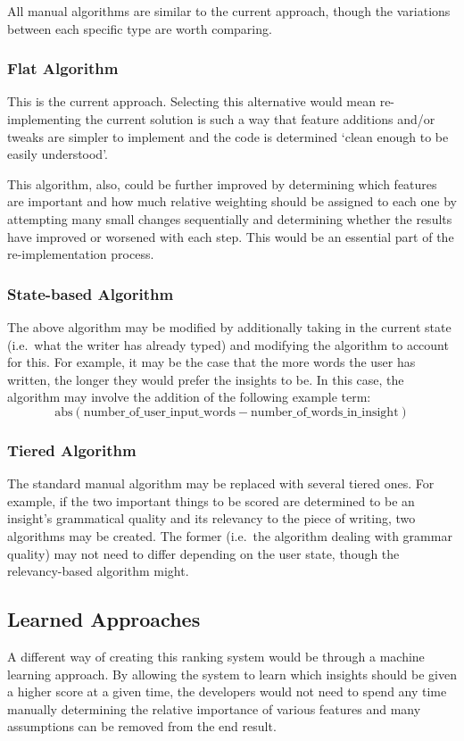 \documentclass[12pt]{article}
\begin{document}
All manual algorithms are similar to the current approach, though the variations between each specific type are worth comparing.

\subsubsection{Flat Algorithm}
This is the current approach. Selecting this alternative would mean re-implementing the current solution is such a way that feature additions and/or tweaks are simpler to implement and the code is determined `clean enough to be easily understood'.

This algorithm, also, could be further improved by determining which features are important and how much relative weighting should be assigned to each one by attempting many small changes sequentially and determining whether the results have improved or worsened with each step. This would be an essential part of the re-implementation process.

\subsubsection{State-based Algorithm}
The above algorithm may be modified by additionally taking in the current state (i.e.\ what the writer has already typed) and modifying the algorithm to account for this. For example, it may be the case that the more words the user has written, the longer they would prefer the insights to be. In this case, the algorithm may involve the addition of the following example term: \[ \textrm{abs} (\textrm{number\_of\_user\_input\_words} - \textrm{number\_of\_words\_in\_insight}) \]

\subsubsection{Tiered Algorithm}
The standard manual algorithm may be replaced with several tiered ones. For example, if the two important things to be scored are determined to be an insight's grammatical quality and its relevancy to the piece of writing, two algorithms may be created. The former (i.e.\ the algorithm dealing with grammar quality) may not need to differ depending on the user state, though the relevancy-based algorithm might.

\subsection{Learned Approaches}
A different way of creating this ranking system would be through a machine learning approach. By allowing the system to learn which insights should be given a higher score at a given time, the developers would not need to spend any time manually determining the relative importance of various features and many assumptions can be removed from the end result.
\end{document}
